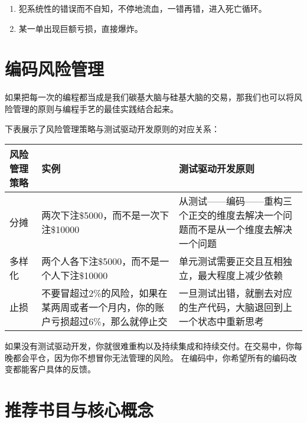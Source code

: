 \documentclass[
  oneside]{book}
\providecommand{\tightlist}{%
  \setlength{\itemsep}{0pt}\setlength{\parskip}{0pt}}
\begin{document}
\begin{enumerate}
\def\labelenumi{\arabic{enumi}.}
\tightlist
\item
  犯系统性的错误而不自知，不停地流血，一错再错，进入死亡循环。
\item
  某一单出现巨额亏损，直接爆炸。
\end{enumerate}

\hypertarget{ux7f16ux7801ux98ceux9669ux7ba1ux7406}{%
\section{编码风险管理}\label{ux7f16ux7801ux98ceux9669ux7ba1ux7406}}

如果把每一次的编程都当成是我们碳基大脑与硅基大脑的交易，那我们也可以将风险管理的原则与编程手艺的最佳实践结合起来。

下表展示了风险管理策略与测试驱动开发原则的对应关系：

\begin{longtable}[]{@{}
  >{\raggedright\arraybackslash}p{}
  >{\raggedright\arraybackslash}p{}
  >{\raggedright\arraybackslash}p{}@{}}
\toprule
风险管理策略 & 实例 & 测试驱动开发原则 \\
\midrule
\endhead
分摊 & 两次下注\$5000，而不是一次下注\$10000 & 从测试------编码------重构三个正交的维度去解决一个问题而不是从一个维度去解决一个问题 \\
多样化 & 两个人各下注\$5000，而不是一个人下注\$10000 & 单元测试需要正交且互相独立，最大程度上减少依赖 \\
止损 & 不要冒超过2\%的风险，如果在某两周或者一个月内，你的账户亏损超过6\%，那么就停止交 & 一旦测试出错，就删去对应的生产代码，大脑退回到上一个状态中重新思考 \\
\bottomrule
\end{longtable}

如果没有测试驱动开发，你就很难重构以及持续集成和持续交付。在交易中，你每晚都会平仓，因为你不想冒你无法管理的风险。
在编码中，你希望所有的编码改变都能客户具体的反馈。

\hypertarget{ux63a8ux8350ux4e66ux76eeux4e0eux6838ux5fc3ux6982ux5ff5}{%
\section{推荐书目与核心概念}\label{ux63a8ux8350ux4e66ux76eeux4e0eux6838ux5fc3ux6982ux5ff5}}
\end{document}
